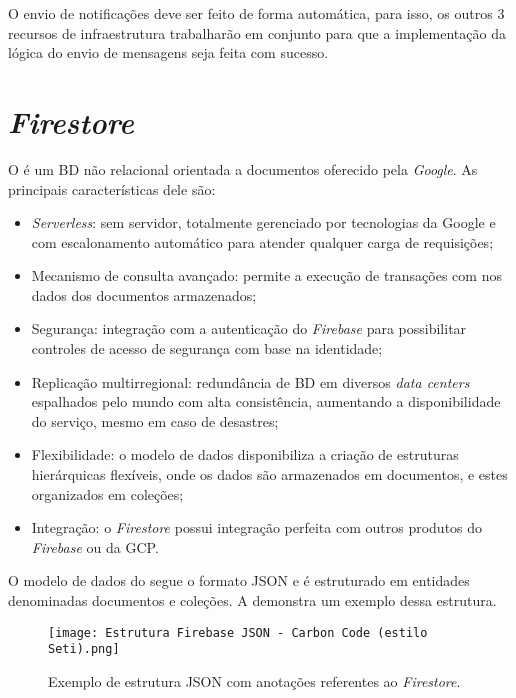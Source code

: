 O envio de notificações deve ser feito de forma automática, para isso, os outros 3 recursos de infraestrutura trabalharão em conjunto para que a implementação da lógica do envio de mensagens seja feita com sucesso.

\section{\textit{Firestore}}\label{sec:firestore}

O \textcite{FirestoreDocs} é um BD não relacional orientada a documentos oferecido pela \textit{Google}. As principais características dele são:

\begin{itemize}
    \item \textit{Serverless}: sem servidor, totalmente gerenciado por tecnologias da Google e com escalonamento automático para atender qualquer carga de requisições;
    \item Mecanismo de consulta avançado: permite a execução de transações com  nos dados dos documentos armazenados;
    \item Segurança: integração com a autenticação do \textit{Firebase} para possibilitar controles de acesso de segurança com base na identidade;
    \item Replicação multirregional: redundância de BD em diversos \textit{data centers} espalhados pelo mundo com alta consistência, aumentando a disponibilidade do serviço, mesmo em caso de desastres;
    \item Flexibilidade: o modelo de dados disponibiliza a criação de estruturas hierárquicas flexíveis, onde os dados são armazenados em documentos, e estes organizados em coleções;
    \item Integração: o \textit{Firestore} possui integração perfeita com outros produtos do \textit{Firebase} ou da GCP.
\end{itemize}

O modelo de dados do \textcite{FirestoreDataModel} segue o formato JSON e é estruturado em entidades denominadas documentos e coleções. A  demonstra um exemplo dessa estrutura.

\begin{figure}[!htb]
    \centering
    \texttt{[image: Estrutura Firebase JSON - Carbon Code (estilo Seti).png]}
    \caption{Exemplo de estrutura JSON com anotações referentes ao \textit{Firestore}.}
    \label{fig:exemplofirestorejson}
\end{figure}

